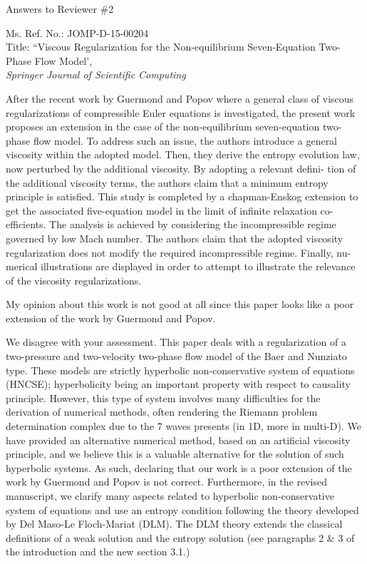 \documentclass{article}
\begin{document}

\begin{center}
{ \Large Answers to Reviewer \#2}
\end{center}

\bigskip

\noindent Ms. Ref. No.: JOMP-D-15-00204\\
Title: ``Viscous Regularization for the Non-equilibrium Seven-Equation Two-Phase Flow Model', \\
{\it Springer Journal of Scientific Computing}\\

%
%
\bigskip

{\color{blue}
After the recent work by Guermond and Popov where a general class of viscous
regularizations of compressible Euler equations is investigated, the present work
proposes an extension in the case of the non-equilibrium seven-equation two-
phase flow model. To address such an issue, the authors introduce a general
viscosity within the adopted model. Then, they derive the entropy evolution
law, now perturbed by the additional viscosity. By adopting a relevant defini-
tion of the additional viscosity terms, the authors claim that a minimum entropy
principle is satisfied. This study is completed by a chapman-Enskog extension
to get the associated five-equation model in the limit of infinite relaxation co-
efficients. The analysis is achieved by considering the incompressible regime
governed by low Mach number. The authors claim that the adopted viscosity
regularization does not modify the required incompressible regime. Finally, nu-
merical illustrations are displayed in order to attempt to illustrate the relevance
of the viscosity regularizations.

My opinion about this work is not good at all since this paper looks like a poor
extension of the work by Guermond and Popov.}

We disagree with your assessment. This paper deals with a regularization of a two-pressure and two-velocity
two-phase flow model of the Baer and Nunziato type. These models are strictly hyperbolic 
non-conservative system of equations (HNCSE); hyperbolicity being an important property with respect to
causality principle. However, this type of system involves many difficulties 
for the derivation of numerical methods, often rendering the Riemann problem determination complex due 
to the 7 waves presents (in 1D, more in multi-D). We have provided an alternative 
numerical method, based on an artificial viscosity principle, and we believe this is a valuable alternative for the
solution of such hyperbolic systems. As such, declaring that our work is a 
poor extension of the work by Guermond and Popov is not correct. Furthermore, in the revised
manuscript, we clarify many aspects related to hyperbolic non-conservative system of equations and  
use an entropy condition following the theory developed by Del Maso-Le Floch-Mariat (DLM). 
The DLM theory extends the classical definitions of a weak solution and the entropy solution
(see paragraphs 2 \& 3 of the introduction and the new section 3.1.)
\end{document}
